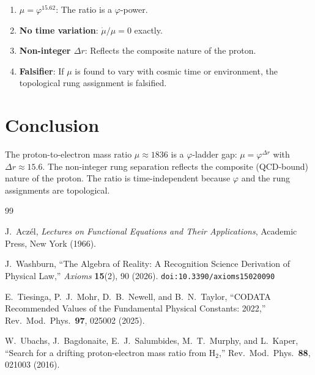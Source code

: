 \documentclass[12pt,a4paper]{article}
\theoremstyle{definition}
\theoremstyle{remark}
\begin{document}
\begin{enumerate}
  \item \textbf{$\mu = \varphi^{15.62}$}: The ratio is a
  $\varphi$-power.

  \item \textbf{No time variation}: $\dot{\mu}/\mu = 0$ exactly.

  \item \textbf{Non-integer $\Delta r$}: Reflects the composite
  nature of the proton.

  \item \textbf{Falsifier}: If $\mu$ is found to vary with
  cosmic time or environment, the topological rung assignment is
  falsified.
\end{enumerate}

\section{Conclusion}
\label{sec:conclusion}

The proton-to-electron mass ratio $\mu \approx 1836$ is a
$\varphi$-ladder gap: $\mu = \varphi^{\Delta r}$ with
$\Delta r \approx 15.6$.  The non-integer rung separation reflects
the composite (QCD-bound) nature of the proton.  The ratio is
time-independent because $\varphi$ and the rung assignments are
topological.

\begin{thebibliography}{99}

J.~Acz\'el, \emph{Lectures on Functional Equations and Their Applications},
Academic Press, New York (1966).

J.~Washburn, ``The Algebra of Reality: A Recognition Science Derivation
of Physical Law,'' \emph{Axioms} \textbf{15}(2), 90 (2026).
\texttt{doi:10.3390/axioms15020090}

E.~Tiesinga, P.~J.~Mohr, D.~B.~Newell, and B.~N.~Taylor,
``CODATA Recommended Values of the Fundamental Physical
Constants: 2022,'' Rev.\ Mod.\ Phys.\ \textbf{97}, 025002
(2025).

W.~Ubachs, J.~Bagdonaite, E.~J.~Salumbides, M.~T.~Murphy,
and L.~Kaper, ``Search for a drifting proton-electron mass
ratio from H$_2$,'' Rev.\ Mod.\ Phys.\ \textbf{88}, 021003
(2016).

\end{thebibliography}
\end{document}
